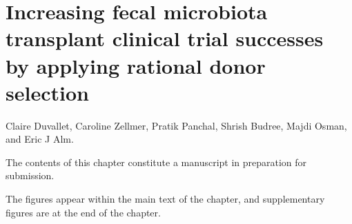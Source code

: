 
\graphicspath{{donor-selection/figures/}}

\chapter{Increasing fecal microbiota transplant clinical trial successes by applying rational donor selection}\label{chap:donor-selection}

\noindent
Claire Duvallet, Caroline Zellmer, Pratik Panchal, Shrish Budree, Majdi Osman, and Eric J Alm.

\bigskip
\bigskip
\noindent
The contents of this chapter constitute a manuscript in preparation for submission.

\bigskip
\bigskip
\noindent
The figures appear within the main text of the chapter, and supplementary figures are at the end of the chapter.

\clearpage

